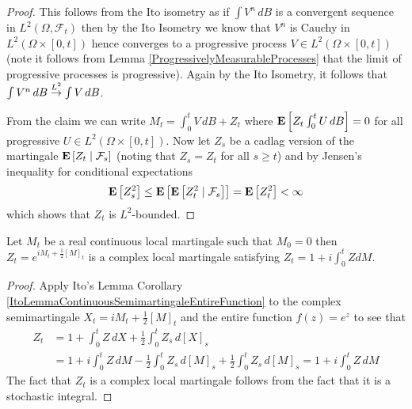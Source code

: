 \begin{proof}
This follows from the Ito isometry as if $\int V^n \, dB$ is a convergent sequence in $L^2(\Omega, \mathcal{F}_t)$ then by the Ito Isometry we know that $V^n$ is Cauchy in $L^2(\Omega \times[0,t])$ hence converges to a progressive process $V \in L^2(\Omega \times [0,t])$ (note it follows from Lemma \ref{ProgressivelyMeasurableProcesses} that the limit of progressive processes is progressive).  Again by the Ito Isometry, it follows that $\int V^n \, dB \tolp{2} \int V \, dB$.  

From the claim we can write $M_t = \int_0^t V \, dB + Z_t$ where $\expectation{Z_t \int_0^t U \, dB} = 0$ for all progressive $U \in L^2(\Omega \times [0,t])$.  Now let $Z_s$ be a cadlag version of the martingale $\cexpectationlong{\mathcal{F}_s}{Z_t}$ (noting that $Z_s = Z_t$ for all $s \geq t$) and by Jensen's inequality for conditional expectations 
\begin{align*}
\expectation{Z_s^2} \leq \expectation{\cexpectationlong{\mathcal{F}_s}{Z^2_t}} = \expectation{Z_t^2} < \infty
\end{align*}
which shows that $Z_t$ is $L^2$-bounded.
\end{proof}

\begin{lem}\label{ComplexExponentialMartingale}Let $M_t$ be a real continuous local martingale such that $M_0=0$ then $Z_t = e^{iM_t + \frac{1}{2}[M]_t}$ is a complex local martingale satisfying $Z_t = 1 + i \int_0^t Z dM$.
\end{lem}
\begin{proof}
Apply Ito's Lemma Corollary \ref{ItoLemmaContinuousSemimartingaleEntireFunction} to the complex semimartingale $X_t = iM_t + \frac{1}{2}[M]_t$ and the entire function $f(z) = e^z$ to see that
\begin{align*}
Z_t &= 1 + \int_0^t Z \, dX + \frac{1}{2} \int_0^t Z_s \, d[X]_s \\
&= 1 + i \int_0^t Z \, dM - \frac{1}{2} \int_0^t Z_s \, d[M]_s +\frac{1}{2}\int_0^t Z_s \, d[M]_s = 1 + i \int_0^t Z\, dM
\end{align*}
The fact that $Z_t$ is a complex local martingale follows from the fact that it is a stochastic integral.
\end{proof}

